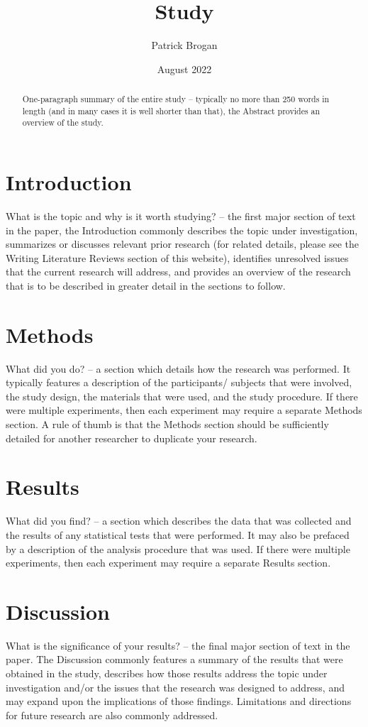 \documentclass[12pt, letterpaper, twoside]{article}
\title{Study}
\author{Patrick Brogan}
\date{August 2022}
\begin{document}
\maketitle

\begin{abstract}
One-paragraph summary of the entire study – typically no more than
250 words in length (and in many cases it is well shorter than that),
the Abstract provides an overview of the study.
\end{abstract}

\section*{Introduction}
What is the topic and why is it worth studying? – the first major
section of text in the paper, the Introduction commonly describes
the topic under investigation, summarizes or discusses relevant
prior research (for related details, please see the Writing Literature
Reviews section of this website), identifies unresolved issues that
the current research will address, and provides an overview of the
research that is to be described in greater detail in the sections to
follow.

\section*{Methods}
What did you do? – a section which details how the research was
performed.  It typically features a description of the participants/
subjects that were involved, the study design, the materials that were
used, and the study procedure.  If there were multiple experiments,
then each experiment may require a separate Methods section.  A rule
of thumb is that the Methods section should be sufficiently detailed
for another researcher to duplicate your research.

\section*{Results}
What did you find? – a section which describes the data that was
collected and the results of any statistical tests that were performed.
It may also be prefaced by a description of the analysis procedure that
was used. If there were multiple experiments, then each experiment may
require a separate Results section.

\section*{Discussion}
What is the significance of your results? – the final major section of
text in the paper.  The Discussion commonly features a summary of the
results that were obtained in the study, describes how those results
address the topic under investigation and/or the issues that the research
was designed to address, and may expand upon the implications of those
findings.  Limitations and directions for future research are also commonly
addressed.
\end{document}
